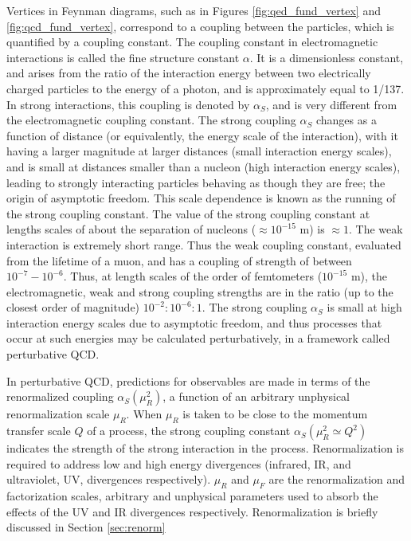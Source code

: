 \documentclass[12pt,a4paper,openright,twoside]{report}
\begin{document}
Vertices in Feynman diagrams, such as in Figures \ref{fig:qed_fund_vertex} and \ref{fig:qcd_fund_vertex}, correspond to a coupling between the particles, which is quantified by a coupling constant. The coupling constant in electromagnetic interactions is called the fine structure constant $\alpha$. It is a dimensionless constant, and arises from the ratio of the interaction energy between two electrically charged particles to the energy of a photon, and is approximately equal to 1/137. In strong interactions, this coupling is denoted by $\alpha_{S}$, and is very different from the electromagnetic coupling constant. The strong coupling $\alpha_{S}$ changes as a function of distance (or equivalently, the energy scale of the interaction), with it having a larger magnitude at larger distances (small interaction energy scales), and is small at distances smaller than a nucleon (high interaction energy scales), leading to strongly interacting particles behaving as though they are free; the origin of asymptotic freedom. This scale dependence is known as the running of the strong coupling constant. The value of the strong coupling constant at lengths scales of about the separation of nucleons ($\approx 10^{-15}$ m) is $\approx 1$. The weak interaction is extremely short range. Thus the weak coupling constant, evaluated from the lifetime of a muon, and has a coupling of strength of between $10^{-7}-10^{-6}$. Thus, at length scales of the order of femtometers ($10^{-15}$ m), the electromagnetic, weak and strong coupling strengths are in the ratio (up to the closest order of magnitude) $10^{-2}:10^{-6}:1$. The strong coupling $\alpha_S$ is small at high interaction energy scales due to asymptotic freedom, and thus processes that occur at such energies may be calculated perturbatively, in a framework called perturbative QCD.

In perturbative QCD, predictions for observables are made in terms of the renormalized coupling $\alpha_S(\mu_R^2)$, a function of an arbitrary unphysical renormalization scale $\mu_R$. When $\mu_R$ is taken to be close to the momentum transfer scale $Q$ of a process, the strong coupling constant $\alpha_S(\mu_R^2 \simeq Q^2)$ indicates the strength of the strong interaction in the process. Renormalization is required to address low and high energy divergences (infrared, IR, and ultraviolet, UV, divergences respectively). $\mu_R$ and $\mu_F$ are the renormalization and factorization scales, arbitrary and unphysical parameters used to absorb the effects of the UV and IR divergences respectively. Renormalization is briefly discussed in Section \ref{sec:renorm}
\end{document}
